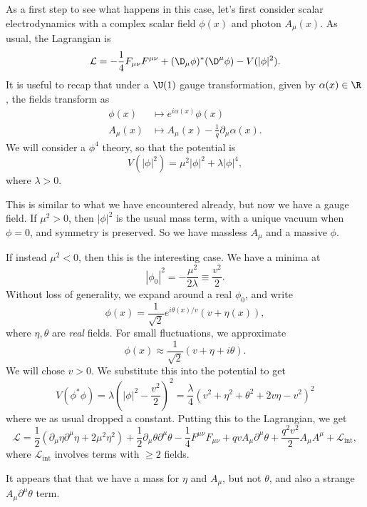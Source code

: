 \documentclass[a4paper]{article}
\begin{document}
As a first step to see what happens in this case, let's first consider scalar electrodynamics with a complex scalar field $\phi(x)$ and photon $A_\mu(x)$. As usual, the Lagrangian is
\[
  \mathcal{L} = -\frac{1}{4} F_{\mu\nu} F^{\mu\nu} + (\D_\mu \phi)^* (\D^\mu \phi) - V(|\phi|^2).
\]
It is useful to recap that under a $\U(1)$ gauge transformation, given by $\alpha(x) \in \R$, the fields transform as
\begin{align*}
  \phi(x) &\mapsto e^{i\alpha(x)} \phi(x)\\
  A_\mu(x) &\mapsto A_\mu(x) - \frac{1}{q} \partial_\mu \alpha(x).
\end{align*}
We will consider a $\phi^4$ theory, so that the potential is
\[
  V(|\phi|^2) = \mu^2 |\phi|^2 + \lambda |\phi|^4,
\]
where $\lambda > 0$.

This is similar to what we have encountered already, but now we have a gauge field. If $\mu^2 > 0$, then $|\phi|^2$ is the usual mass term, with a unique vacuum when $\phi = 0$, and symmetry is preserved. So we have massless $A_\mu$ and a massive $\phi$.

If instead $\mu^2 < 0$, then this is the interesting case. We have a minima at
\[
  |\phi_0|^2 = -\frac{\mu^2}{2\lambda} \equiv \frac{v^2}{2}.
\]
Without loss of generality, we expand around a real $\phi_0$, and write
\[
  \phi(x) = \frac{1}{\sqrt{2}} e^{i \theta(x)/v} (v + \eta(x)),
\]
where $\eta, \theta$ are \emph{real} fields. For small fluctuations, we approximate
\[
  \phi(x) \approx \frac{1}{\sqrt{2}} (v + \eta + i \theta).
\]
We will chose $v > 0$. We substitute this into the potential to get
\[
  V(\phi^* \phi) = \lambda \left(|\phi|^2 - \frac{v^2}{2}\right)^2 = \frac{\lambda}{4} (v^2 + \eta^2 + \theta^2 + 2 v \eta - v^2)^2 %
\]
where we as usual dropped a constant. Putting this to the Lagrangian, we get
\[
  \mathcal{L} = \frac{1}{2} \left(\partial_\mu \eta \partial^\mu \eta + 2 \mu^2 \eta^2\right) + \frac{1}{2} \partial_\mu \theta \partial^\mu \theta - \frac{1}{4} F^{\mu\nu} F_{\mu\nu} + qv A_\mu \partial^\mu \theta + \frac{q^2 v^2}{2} A_\mu A^\mu + \mathcal{L}_{\mathrm{int}},
\]
where $\mathcal{L}_{\mathrm{int}}$ involves terms with $\geq 2$ fields.

It appears that that we have a mass for $\eta$ and $A_\mu$, but not $\theta$, and also a strange $A_\mu \partial^\mu \theta$ term.
\end{document}
